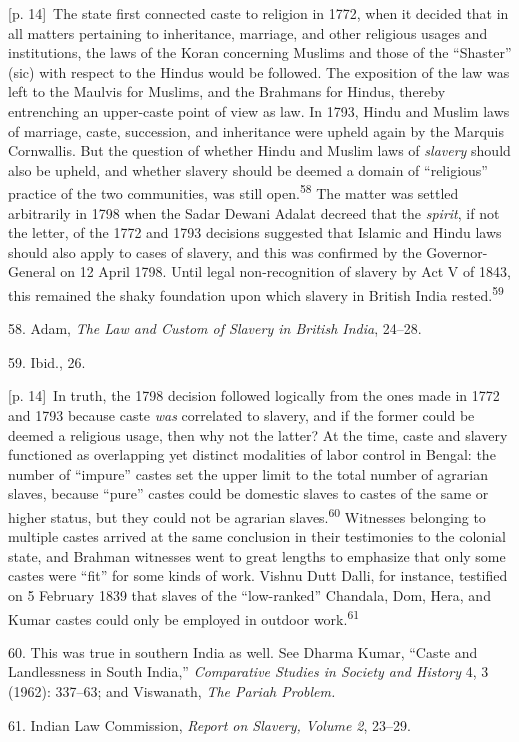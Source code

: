 \documentclass[10pt,a4paper]{article}
\begin{document}
{\scriptsize\color{gray} [p. 14]}\ The state first connected caste to religion in 1772, when it decided that in all matters pertaining to inheritance, marriage, and other religious usages and institutions, the laws of the Koran concerning Muslims and those of the “Shaster” (sic) with respect to the Hindus would be followed. The exposition of the law was left to the Maulvis for Muslims, and the Brahmans for Hindus, thereby entrenching an upper-caste point of view as law. In 1793, Hindu and Muslim laws of marriage, caste, succession, and inheritance were upheld again by the Marquis Cornwallis. But the question of whether Hindu and Muslim laws of \textit{slavery} should also be upheld, and whether slavery should be deemed a domain of “religious” practice of the two communities, was still open.\nobreak\textsuperscript{58} The matter was settled arbitrarily in 1798 when the Sadar Dewani Adalat decreed that the \textit{spirit}, if not the letter, of the 1772 and 1793 decisions suggested that Islamic and Hindu laws should also apply to cases of slavery, and this was confirmed by the Governor-General on 12 April 1798. Until legal non-recognition of slavery by Act V of 1843, this remained the shaky foundation upon which slavery in British India rested.\nobreak\textsuperscript{59}\par{\small 58. Adam, \textit{The Law and Custom of Slavery in British India}, 24–28.\par}{\small 59. Ibid., 26.\par}
{\scriptsize\color{gray} [p. 14]}\ In truth, the 1798 decision followed logically from the ones made in 1772 and 1793 because caste \textit{was} correlated to slavery, and if the former could be deemed a religious usage, then why not the latter? At the time, caste and slavery functioned as overlapping yet distinct modalities of labor control in Bengal: the number of “impure” castes set the upper limit to the total number of agrarian slaves, because “pure” castes could be domestic slaves to castes of the same or higher status, but they could not be agrarian slaves.\nobreak\textsuperscript{60} Witnesses belonging to multiple castes arrived at the same conclusion in their testimonies to the colonial state, and Brahman witnesses went to great lengths to emphasize that only some castes were “fit” for some kinds of work. Vishnu Dutt Dalli, for instance, testified on 5 February 1839 that slaves of the “low-ranked” Chandala, Dom, Hera, and Kumar castes could only be employed in outdoor work.\nobreak\textsuperscript{61}\par{\small 60. This was true in southern India as well. See Dharma Kumar, “Caste and Landlessness in South India,” \textit{Comparative Studies in Society and History} 4, 3 (1962): 337–63; and Viswanath, \textit{The Pariah Problem.}\par}{\small 61. Indian Law Commission, \textit{Report on Slavery, Volume 2}, 23–29.\par}
\end{document}
